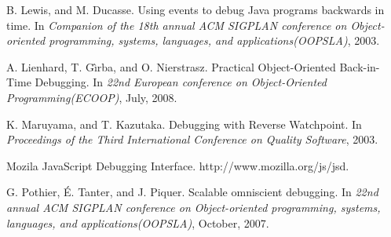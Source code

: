 \documentclass[runningheads,a4paper]{llncs}
\begin{document}
\begin{thebibliography}{16}
B. Lewis, and M. Ducasse. \newblock Using events to debug Java programs backwards in time.
\newblock In \emph{Companion of the 18th annual ACM SIGPLAN conference on Object-oriented programming, systems, languages, and applications(OOPSLA)},
2003.

A. Lienhard, T. G\^{\i}rba, and O. Nierstrasz. \newblock Practical Object-Oriented Back-in-Time Debugging.
\newblock In \emph{22nd European conference on Object-Oriented Programming(ECOOP)},
July, 2008.

K. Maruyama, and T. Kazutaka. \newblock Debugging with Reverse Watchpoint.
\newblock In \emph{Proceedings of the Third International Conference on Quality Software},
2003.

Mozila JavaScript Debugging Interface. \newblock http://www.mozilla.org/js/jsd.

G. Pothier, \'{E}. Tanter, and J. Piquer. \newblock Scalable omniscient debugging.
\newblock In \emph{22nd annual ACM SIGPLAN conference on Object-oriented programming, systems, languages, and applications(OOPSLA)},
October, 2007.


\end{thebibliography}
\end{document}
